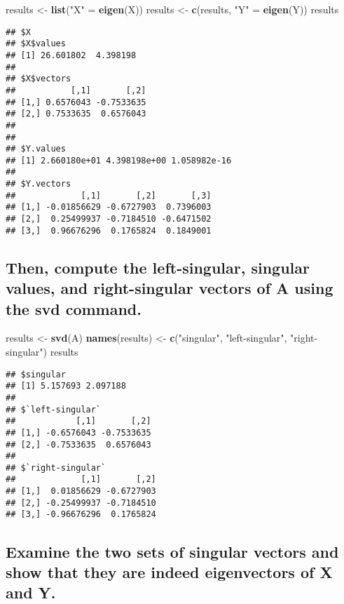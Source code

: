 \documentclass[]{article}
\newenvironment{Shaded}{\begin{snugshade}}{\end{snugshade}}
\newcommand{\KeywordTok}[1]{\textcolor[rgb]{0.13,0.29,0.53}{\textbf{{#1}}}}
\newcommand{\StringTok}[1]{\textcolor[rgb]{0.31,0.60,0.02}{{#1}}}
\newcommand{\NormalTok}[1]{{#1}}
\begin{document}
\begin{Shaded}
\begin{Highlighting}[]
\NormalTok{results <-}\StringTok{ }\KeywordTok{list}\NormalTok{(}\StringTok{"X"} \NormalTok{=}\StringTok{ }\KeywordTok{eigen}\NormalTok{(X))}
\NormalTok{results <-}\StringTok{ }\KeywordTok{c}\NormalTok{(results, }\StringTok{"Y"} \NormalTok{=}\StringTok{ }\KeywordTok{eigen}\NormalTok{(Y))}
\NormalTok{results}
\end{Highlighting}
\end{Shaded}

\begin{verbatim}
## $X
## $X$values
## [1] 26.601802  4.398198
## 
## $X$vectors
##           [,1]       [,2]
## [1,] 0.6576043 -0.7533635
## [2,] 0.7533635  0.6576043
## 
## 
## $Y.values
## [1] 2.660180e+01 4.398198e+00 1.058982e-16
## 
## $Y.vectors
##             [,1]       [,2]       [,3]
## [1,] -0.01856629 -0.6727903  0.7396003
## [2,]  0.25499937 -0.7184510 -0.6471502
## [3,]  0.96676296  0.1765824  0.1849001
\end{verbatim}

\subsection{Then, compute the left-singular, singular values, and
right-singular vectors of A using the svd
command.}\label{then-compute-the-left-singular-singular-values-and-right-singular-vectors-of-a-using-the-svd-command.}

\begin{Shaded}
\begin{Highlighting}[]
\NormalTok{results <-}\StringTok{ }\KeywordTok{svd}\NormalTok{(A)}
\KeywordTok{names}\NormalTok{(results) <-}\StringTok{ }\KeywordTok{c}\NormalTok{(}\StringTok{"singular"}\NormalTok{, }\StringTok{"left-singular"}\NormalTok{, }\StringTok{"right-singular"}\NormalTok{)}
\NormalTok{results}
\end{Highlighting}
\end{Shaded}

\begin{verbatim}
## $singular
## [1] 5.157693 2.097188
## 
## $`left-singular`
##            [,1]       [,2]
## [1,] -0.6576043 -0.7533635
## [2,] -0.7533635  0.6576043
## 
## $`right-singular`
##             [,1]       [,2]
## [1,]  0.01856629 -0.6727903
## [2,] -0.25499937 -0.7184510
## [3,] -0.96676296  0.1765824
\end{verbatim}

\subsection{Examine the two sets of singular vectors and show that they
are indeed eigenvectors of X and
Y.}\label{examine-the-two-sets-of-singular-vectors-and-show-that-they-are-indeed-eigenvectors-of-x-and-y.}
\end{document}
